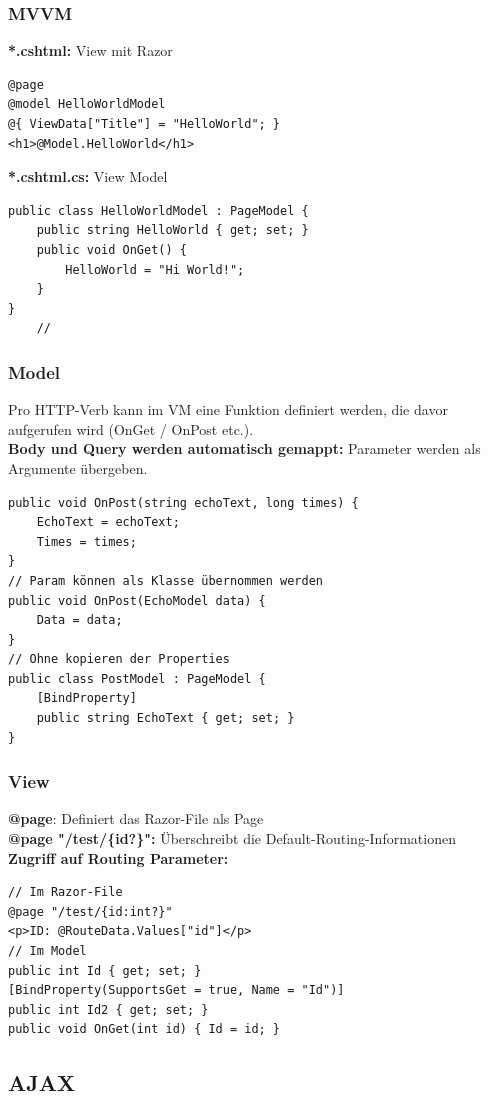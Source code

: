 \subsubsection{MVVM}
\textbf{*.cshtml:} View mit Razor
\begin{lstlisting}
@page
@model HelloWorldModel
@{ ViewData["Title"] = "HelloWorld"; }
<h1>@Model.HelloWorld</h1>
\end{lstlisting}
\textbf{*.cshtml.cs:} View Model
\begin{lstlisting}
public class HelloWorldModel : PageModel {
    public string HelloWorld { get; set; }
    public void OnGet() {
        HelloWorld = "Hi World!";
    }
}
    //
\end{lstlisting}

\subsubsection{Model}
Pro HTTP-Verb kann im VM eine Funktion definiert werden, die davor aufgerufen wird (OnGet / OnPost etc.).\\
\textbf{Body und Query werden automatisch gemappt:} Parameter werden als Argumente übergeben.
\begin{lstlisting}
public void OnPost(string echoText, long times) {
    EchoText = echoText;
    Times = times;
}
// Param können als Klasse übernommen werden
public void OnPost(EchoModel data) {
    Data = data;
}
// Ohne kopieren der Properties
public class PostModel : PageModel {
    [BindProperty]
    public string EchoText { get; set; }
}
\end{lstlisting}

\subsubsection{View}
\textbf{@page}: Definiert das Razor-File als Page\\
\textbf{@page "/test/\{id?\}":} Überschreibt die Default-Routing-Informationen\\
\textbf{Zugriff auf Routing Parameter:}
\begin{lstlisting}
// Im Razor-File
@page "/test/{id:int?}"
<p>ID: @RouteData.Values["id"]</p>
// Im Model
public int Id { get; set; }
[BindProperty(SupportsGet = true, Name = "Id")]
public int Id2 { get; set; }
public void OnGet(int id) { Id = id; }
\end{lstlisting}

\subsection{AJAX}
